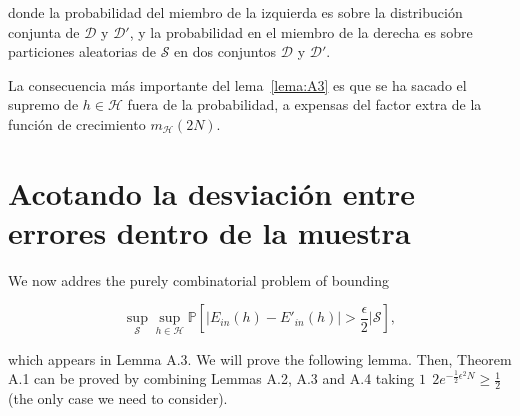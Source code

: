 donde la probabilidad del miembro de la izquierda es sobre la distribución
conjunta de $\mathcal{D}$ y $\mathcal{D}'$, y la probabilidad en el miembro de
la derecha es sobre particiones aleatorias de $\mathcal{S}$ en dos conjuntos
$\mathcal{D}$ y $\mathcal{D}'$.

La consecuencia más importante del lema~\ref{lema:A3} es que se ha sacado el
supremo de $h \in \mathcal{H}$ fuera de la probabilidad, a expensas del factor
extra de la función de crecimiento $m_{\mathcal{H}}(2N)$.

\section{Acotando la desviación entre errores dentro de la muestra}

We now addres the purely combinatorial problem of bounding

\begin{displaymath}
    \sup_{\mathcal{S}} \sup_{h \in \mathcal{H}} \mathbb{P} \left[| E_{in}(h) - E'_{in}(h) | > \frac{\epsilon}{2} \Big\vert \mathcal{S} \right],
\end{displaymath}

which appears in Lemma A.3. We will prove the following lemma. Then, Theorem A.1 can be proved by combining Lemmas A.2, A.3 and A.4 taking $1 \ \ 2e^{- \frac{1}{2} \epsilon^2 N} \geq \frac{1}{2}$ (the only case we need to consider).

